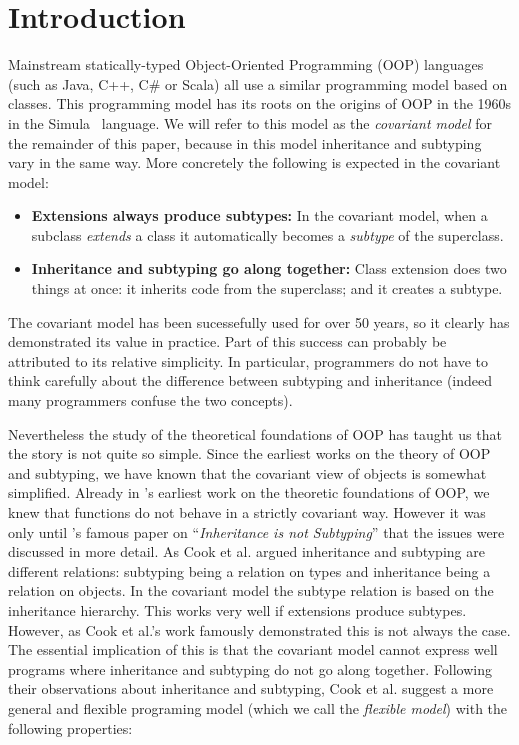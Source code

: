 \section{Introduction}
\label{sec:intro}

Mainstream statically-typed Object-Oriented Programming (OOP) languages (such as Java,
C++, C\# or Scala) all use a similar programming model based on
classes. This programming model has its roots on the
origins of OOP in the 1960s in the Simula~\cite{dahl1967simula} language.
We will refer to this model as the \emph{covariant model} for the
remainder of this paper, because in this model inheritance and
subtyping vary in the same way. More concretely
the following is expected in the covariant model:

\begin{itemize}

\item {\bf Extensions always produce subtypes:} In the covariant model, when a 
subclass \emph{extends} a class it automatically becomes a 
\emph{subtype} of the superclass.

\item{\bf Inheritance and subtyping go along together:}
Class extension does two things at once: it inherits code from the
superclass; and it creates a subtype. 

\end{itemize}

The covariant model has been sucessefully used for over 50 years,
so it clearly has demonstrated its value in practice. 
Part of this success can probably be attributed 
to its relative simplicity. In particular, programmers do not have to think carefully 
about the difference between subtyping and inheritance (indeed many
programmers confuse the two concepts). 

Nevertheless the study of the theoretical foundations of OOP has taught us that
the story is not quite so simple. Since the earliest works on the theory of OOP
and subtyping, we have known that the covariant view of objects is somewhat
simplified. Already in \citet{cardelli1984semantics}'s earliest work on
the theoretic foundations of OOP, we knew that functions do not behave in a
strictly covariant way. However it was only until \citet{cook1989inheritance}'s
famous paper on ``\emph{Inheritance is not Subtyping}'' that the issues were
discussed in more detail. As Cook et al. argued inheritance and subtyping are
different relations: subtyping being a relation on types and inheritance being a
relation on objects. In the covariant model the subtype relation is based on the
inheritance hierarchy. This works very well if extensions produce subtypes.
However, as Cook et al.'s work famously demonstrated this is not always the
case. The essential implication of this is that the covariant model cannot
express well programs where inheritance and subtyping do not go along together.
Following their observations about inheritance and subtyping, Cook et al.
suggest a more general and flexible programing model (which we call the
\emph{flexible model}) with the following properties:

